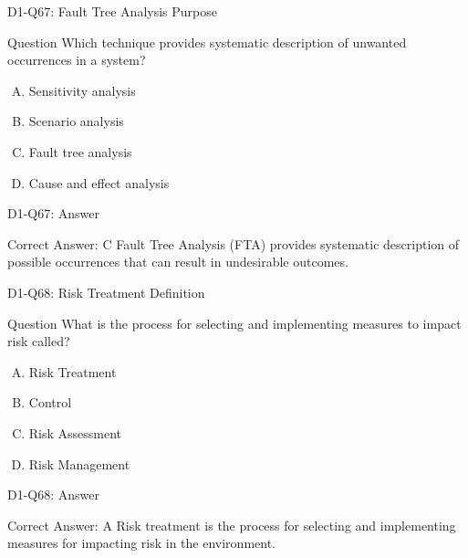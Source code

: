 \documentclass{beamer}
\begin{document}
	\begin{frame}{D1-Q67: Fault Tree Analysis Purpose}
		\begin{block}{Question}
			Which technique provides systematic description of unwanted occurrences in a system?
		\end{block}
		\begin{enumerate}[(A)]
			\item Sensitivity analysis
			\item Scenario analysis
			\item Fault tree analysis
			\item Cause and effect analysis
		\end{enumerate}
	\end{frame}
	\begin{frame}{D1-Q67: Answer}
		\begin{block}{Correct Answer: C}
			Fault Tree Analysis (FTA) provides systematic description of possible occurrences that can result in undesirable outcomes.
		\end{block}
	\end{frame}
	
	\begin{frame}{D1-Q68: Risk Treatment Definition}
		\begin{block}{Question}
			What is the process for selecting and implementing measures to impact risk called?
		\end{block}
		\begin{enumerate}[(A)]
			\item Risk Treatment
			\item Control
			\item Risk Assessment
			\item Risk Management
		\end{enumerate}
	\end{frame}
	\begin{frame}{D1-Q68: Answer}
		\begin{block}{Correct Answer: A}
			Risk treatment is the process for selecting and implementing measures for impacting risk in the environment.
		\end{block}
	\end{frame}
	
\end{document}
